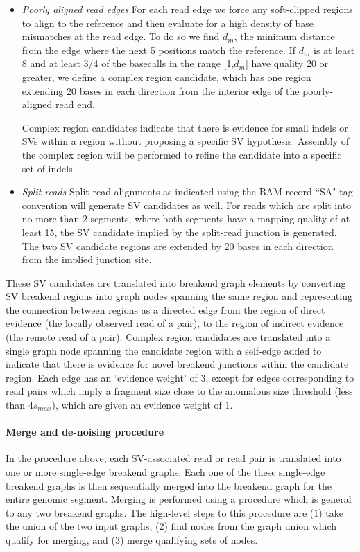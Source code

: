 \documentclass{article}
\begin{document}
\begin{itemize}
\item \textit{Poorly aligned read edges} For each read edge we force any soft-clipped regions to align to the reference and then evaluate for a high density of base mismatches at the read edge. To do so we find $d_{m}$, the minimum distance from the edge where the next 5 positions match the reference. If $d_{m}$ is at least 8 and at least 3/4 of the basecalls in the range [1,$d_{m}$] have quality 20 or greater, we define a complex region candidate, which has one region extending 20 bases in each direction from the interior edge of the poorly-aligned read end.

Complex region candidates indicate that there is evidence for small indels or SVs within a region without proposing a specific SV hypothesis. Assembly of the complex region will be performed to refine the candidate into a specific set of indels.

\item \textit{Split-reads} Split-read alignments as indicated using the BAM record ``SA" tag convention will generate SV candidates as well. For reads which are split into no more than 2 segments, where both segments have a mapping quality of at least 15, the SV candidate implied by the split-read junction is generated. The two SV candidate regions are extended by 20 bases in each direction from the implied junction site.

\end{itemize}

These SV candidates are translated into breakend graph elements by converting SV breakend regions into graph nodes spanning the same region and representing the connection between regions as a directed edge from the region of direct evidence (the locally observed read of a pair), to the region of indirect evidence (the remote read of a pair). Complex region candidates are translated into a single graph node spanning the candidate region with a self-edge added to indicate that there is evidence for novel breakend junctions within the candidate region. Each edge has an `evidence weight' of 3, except for edges corresponding to read pairs which imply a fragment size close to the anomalous size threshold (less than $4s_{max}$), which are given an evidence weight of 1. 

\paragraph{Merge and de-noising procedure}

In the procedure above, each SV-associated read or read pair is translated into one or more single-edge breakend graphs. Each one of the these single-edge breakend graphs is then sequentially merged into the breakend graph for the entire genomic segment. Merging is performed using a procedure which is general to any two breakend graphs. The high-level steps to this procedure are (1) take the union of the two input graphs, (2) find nodes from the graph union which qualify for merging, and (3) merge qualifying sets of nodes.
\end{document}
